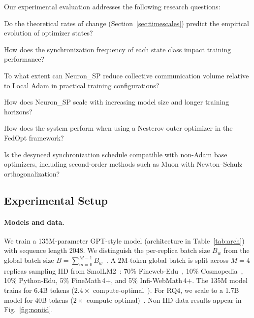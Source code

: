 \documentclass{article}
\begin{document}
Our experimental evaluation addresses the following research questions:
\begin{description}[nosep,leftmargin=*]
\item[RQ1] Do the theoretical rates of change
  (Section~\ref{sec:timescales}) predict the empirical evolution of
  optimizer states?
\item[RQ2] How does the synchronization frequency of each state class
  impact training performance?
\item[RQ3] To what extent can Neuron\_SP reduce collective communication
  volume relative to Local Adam in practical training configurations?
\item[RQ4] How does Neuron\_SP scale with increasing model size and
  longer training horizons?
\item[RQ5] How does the system perform when using a Nesterov outer
  optimizer in the FedOpt framework?
\item[RQ6] Is the desynced synchronization schedule compatible with
  non-Adam base optimizers, including second-order methods such as Muon
  with Newton--Schulz orthogonalization?
\end{description}

\subsection{Experimental Setup}
\label{sec:experimental_setup}

\paragraph{Models and data.}
We train a 135M-parameter GPT-style model (architecture in
Table~\ref{tab:arch}) with sequence length 2048. We distinguish the
per-replica batch size $B_w$ from the global batch size
$B = \sum_{m=0}^{M-1} B_w$~\citep{sani2025photon}. A 2M-token global
batch is split across $M = 4$ replicas sampling IID from
SmolLM2~\citep{allal2025smollm2}: 70\% Fineweb-Edu~\citep{penedo2024fineweb},
10\% Cosmopedia~\citep{benallal2024cosmopedia}, 10\% Python-Edu,
5\% FineMath\,4+, and 5\% Infi-WebMath\,4+. The 135M model trains for
6.4B tokens ($2.4\times$ compute-optimal~\citep{hoffmann2022training}).
For RQ4, we scale to a 1.7B model for 40B tokens
($2\times$ compute-optimal)~\citep{sardana2024beyond}. Non-IID data
results appear in Fig.~\ref{fig:noniid}.
\end{document}
